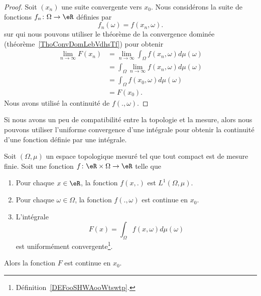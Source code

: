 \begin{proof}
	Soit \( (x_n)\) une suite convergente vers \( x_0\). Nous considérons la suite de fonctions \( f_n\colon \Omega\to \eR\) définies par
	\begin{equation}
		f_n(\omega)=f(x_n,\omega).
	\end{equation}
	sur qui nous pouvons utiliser le théorème de la convergence dominée (théorème~\ref{ThoConvDomLebVdhsTf}) pour obtenir
	\begin{subequations}
		\begin{align}
			\lim_{n\to \infty} F(x_n) & =\lim_{n\to \infty} \int_{\Omega}f(x_n,\omega)d\mu(\omega) \\
			                          & =\int_{\Omega}\lim_{n\to \infty} f(x_n,\omega)d\mu(\omega) \\
			                          & =\int_{\Omega}f(x_0,\omega)d\mu(\omega)                    \\
			                          & =F(x_0).
		\end{align}
	\end{subequations}
	Nous avons utilisé la continuité de \( f(.,\omega)\).
\end{proof}

Si nous avons un peu de compatibilité entre la topologie et la mesure, alors nous pouvons utiliser l'uniforme convergence d'une intégrale pour obtenir la continuité d'une fonction définie par une intégrale.

\begin{theorem} \label{ThotexmgE}
	Soit \( (\Omega,\mu)\) un espace topologique mesuré tel que tout compact est de mesure finie. Soit une fonction \( f\colon \eR\times \Omega\to \eR\) telle que
	\begin{enumerate}
		\item
		      Pour chaque \( x\in \eR\), la fonction \( f(x,.)\) est \( L^1(\Omega,\mu)\).
		\item
		      Pour chaque \( \omega\in \Omega\), la fonction \( f(.,\omega)\) est continue en \( x_0\).
		\item
		      L'intégrale
		      \begin{equation}
			      F(x)=\int_{\Omega}f(x,\omega)d\mu(\omega)
		      \end{equation}
		      est uniformément convergente\footnote{Définition~\ref{DEFooSHWAooWtswtp}.}.
	\end{enumerate}
	Alors la fonction \( F\) est continue en \( x_0\).
\end{theorem}

